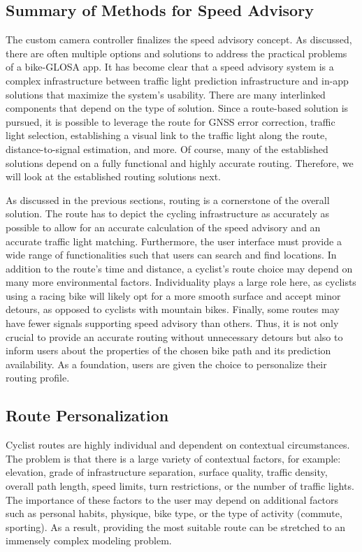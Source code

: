 \subsection{Summary of Methods for Speed Advisory}

The custom camera controller finalizes the speed advisory concept. As discussed, there are often multiple options and solutions to address the practical problems of a bike-GLOSA app. It has become clear that a speed advisory system is a complex infrastructure between traffic light prediction infrastructure and in-app solutions that maximize the system's usability. There are many interlinked components that depend on the type of solution. Since a route-based solution is pursued, it is possible to leverage the route for GNSS error correction, traffic light selection, establishing a visual link to the traffic light along the route, distance-to-signal estimation, and more. Of course, many of the established solutions depend on a fully functional and highly accurate routing. Therefore, we will look at the established routing solutions next.

As discussed in the previous sections, routing is a cornerstone of the overall solution. The route has to depict the cycling infrastructure as accurately as possible to allow for an accurate calculation of the speed advisory and an accurate traffic light matching. Furthermore, the user interface must provide a wide range of functionalities such that users can search and find locations. In addition to the route's time and distance, a cyclist's route choice may depend on many more environmental factors. Individuality plays a large role here, as cyclists using a racing bike will likely opt for a more smooth surface and accept minor detours, as opposed to cyclists with mountain bikes. Finally, some routes may have fewer signals supporting speed advisory than others. Thus, it is not only crucial to provide an accurate routing without unnecessary detours but also to inform users about the properties of the chosen bike path and its prediction availability. As a foundation, users are given the choice to personalize their routing profile.

\subsection{Route Personalization} 

Cyclist routes are highly individual and dependent on contextual circumstances. The problem is that there is a large variety of contextual factors, for example: elevation, grade of infrastructure separation, surface quality, traffic density, overall path length, speed limits, turn restrictions, or the number of traffic lights. The importance of these factors to the user may depend on additional factors such as personal habits, physique, bike type, or the type of activity (commute, sporting). As a result, providing the most suitable route can be stretched to an immensely complex modeling problem.

